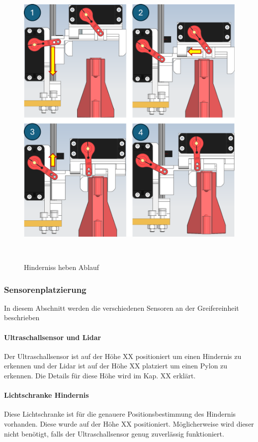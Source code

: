 \documentclass[main.tex]{subfiles} %
\begin{document}
\begin{figure}[H]
    \centering
    \includegraphics[width=1\textwidth]{Hinderniss_heben_Ablauf.png}
    \caption{Hinderniss heben Ablauf}~\label{fig:Hinderniss heben Ablauf}
\end{figure}


\subsubsection*{Sensorenplatzierung}

In diesem Abschnitt werden die verschiedenen Sensoren an der Greifereinheit beschrieben

\paragraph{Ultraschallsensor und Lidar}
Der Ultraschallsensor ist auf der Höhe XX positioniert um einen Hindernis zu erkennen 
und der Lidar ist auf der Höhe XX platziert um einen Pylon zu erkennen.
Die Details für diese Höhe wird im Kap. XX erklärt.


\paragraph{Lichtschranke Hindernis}
Diese Lichtschranke ist für die genauere Positionsbestimmung des Hindernis vorhanden.
Diese wurde auf der Höhe XX positioniert. Möglicherweise wird dieser nicht benötigt, falls der Ultraschallsensor 
genug zuverlässig funktioniert.
\end{document}
